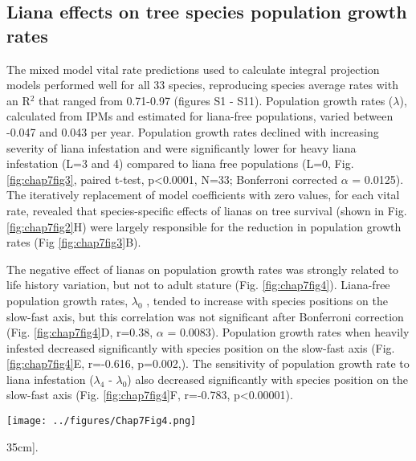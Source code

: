 \documentclass[b5paper,justified]{tufte-book} %
\begin{document}
\begin{fullwidth}
\subsection{Liana effects on tree species population growth rates}
The mixed model vital rate predictions used to calculate integral projection models performed well for all 33 species, reproducing species average rates with an R$^2$ that ranged from 0.71-0.97 (figures S1 - S11). Population growth rates ($\lambda$), calculated from IPMs and estimated for liana-free populations, varied between -0.047 and 0.043 per year. Population growth rates declined with increasing severity of liana infestation and were significantly lower for heavy liana infestation (L=3 and 4) compared to liana free populations (L=0, Fig. \ref{fig:chap7fig3}, paired t-test, p<0.0001, N=33; Bonferroni corrected $\alpha$ = 0.0125).  The iteratively replacement of model coefficients with zero values, for each vital rate, revealed that species-specific effects of lianas on tree survival (shown in Fig. \ref{fig:chap7fig2}H) were largely responsible for the reduction in population growth rates (Fig \ref{fig:chap7fig3}B).   

The negative effect of lianas on population growth rates was strongly related to life history variation, but not to adult stature (Fig. \ref{fig:chap7fig4}). Liana-free population growth rates, $\lambda_0$ , tended to increase with species positions on the slow-fast axis, but this correlation was not significant after Bonferroni correction (Fig. \ref{fig:chap7fig4}D, r=0.38, $\alpha$ = 0.0083). Population growth rates when heavily infested decreased significantly with species position on the slow-fast axis (Fig. \ref{fig:chap7fig4}E, r=-0.616, p=0.002,). The sensitivity of population growth rate to liana infestation ($\lambda_4$ - $\lambda_0$) also decreased significantly with species position on the slow-fast axis (Fig. \ref{fig:chap7fig4}F, r=-0.783, p<0.00001). 


\begin{figure*}
\hspace*{0cm}\texttt{[image: ../figures/Chap7Fig4.png]}
\caption[The effects of liana infestation on expected demographic rates as a function of tree size][35cm]{.}
\label{fig:chap7fig4}
\vspace*{0.3cm}


\end{figure*}
\end{fullwidth}
\end{document}
